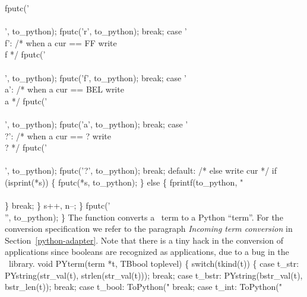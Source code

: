         fputc('\\\\', to_python);
        fputc('r', to_python);
        break;
      case '\\f':                /* when a cur == FF write \\f */
        fputc('\\\\', to_python);
        fputc('f', to_python);
        break;
      case '\\a':                /* when a cur == BEL write \\a */
        fputc('\\\\', to_python);
        fputc('a', to_python);
        break;
      case '\\?':                /* when a cur == ? write \\? */
        fputc('\\\\', to_python);
        fputc('?', to_python);
        break;
      default:                  /* else write cur */
        if (isprint(*s)) \{
          fputc(*s, to_python);
        \} else \{
          fprintf(to_python, "\\\\%
        \}
        break;
    \}
    s++, n--;
  \}
  fputc('\\'', to_python);
\}
\nwendcode{}\nwdocspar
The  function converts a \TB\ term to a Python
``term''. For the conversion specification we refer to the paragraph
\emph{Incoming term conversion} in Section~\ref{python-adapter}.  Note
that there is a tiny hack in the conversion of applications since
booleans are recognized as applications, due to a bug in the \TB\
library. 
\nwenddocs{}\plusendmoddef\nwstartdeflinemarkup{}\nwenddeflinemarkup
void PYterm(term *t, TBbool toplevel) \{
  switch(tkind(t)) \{
    case t_str:
      PYstring(str_val(t), strlen(str_val(t)));
      break;
    case t_bstr:
      PYstring(bstr_val(t), bstr_len(t));
      break;
    case t_bool:
      ToPython("%
      break;
    case t_int:
      ToPython("%
